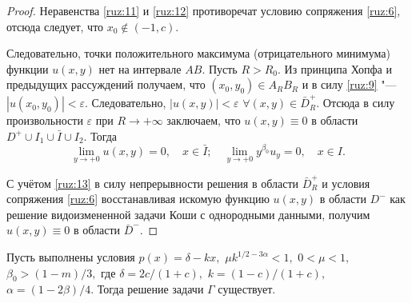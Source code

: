 \begin{proof}
Неравенства \eqref{ruz:11} и \eqref{ruz:12} противоречат условию сопряжения \eqref{ruz:6},
отсюда следует, что ${x_0}\notin(-1, c)$.

Следовательно, точки положительного максимума (отрицательного минимума)
функции $u(x,y)$ нет на интервале $AB$. Пусть $R>{R_0}$.
Из принципа Хопфа и предыдущих рассуждений получаем, что
$(x_0,y_0)\in A_RB_R$  и в силу \eqref{ruz:9} "--- $|u(x_0,y_0)|<\varepsilon$.
Следовательно, $|u(x,y)|<\varepsilon$
$\forall (x,y)\in\bar D_R^{+}$. Отсюда в силу произвольности
$\varepsilon$  при $R\to+\infty$ заключаем, что $u(x,y)\equiv0$
в области $D^{+}\cup I_1\cup\bar I\cup I_2$. Тогда
\begin{equation}
\lim\limits_{y\to+0}u(x,y)=0, \quad x\in\bar I; \quad \lim\limits_{y\to+0}y^{\beta_0}u_y=0, \quad x\in I.
\label{ruz:13}
\end{equation}

С учётом \eqref{ruz:13} в силу непрерывности решения в области
$\bar D_R^{+}$ и условия сопряжения \eqref{ruz:6} восстанавливая искомую
функцию $u(x,y)$ в области $D^-$ как решение  видоизмененной задачи
Коши с однородными данными, получим $u(x,y)\equiv0$ в
области $\bar D^-$. \end{proof}

\smallskip


\begin{theorem}[2]Пусть выполнены условия $p(x){=}\delta-kx,$ $\mu k^{{1}/{2}-3\alpha}<1,$
${0<\mu<1},$ $\beta_0>({1-m})/{3},$
где  $\delta=2c/(1+c),$ $k=(1-c)/(1+c),$ $\alpha=(1-2\beta)/4.$ Тогда решение задачи \hyperlink{ruz:G}{$\Gamma $} существует{\rm .}
\end{theorem}

